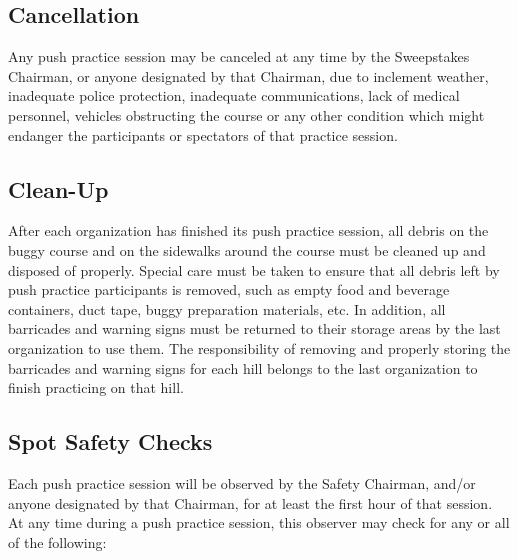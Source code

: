\subsection{Cancellation}

	Any push practice session may be canceled at any time by the Sweepstakes
	Chairman, or anyone designated by that Chairman, due to inclement weather,
	inadequate police protection, inadequate communications, lack of medical
	personnel, vehicles obstructing the course or any other condition which might
	endanger the participants or spectators of that practice session.

\subsection{Clean-Up}

	After each organization has finished its push practice session, all debris on
	the buggy course and on the sidewalks around the course must be cleaned up and
	disposed of properly. Special care must be taken to ensure that all debris left
	by push practice participants is removed, such as empty food and beverage
	containers, duct tape, buggy preparation materials, etc. In addition, all
	barricades and warning signs must be returned to their storage areas by the
	last organization to use them. The responsibility of removing and properly
	storing the barricades and warning signs for each hill belongs to the last
	organization to finish practicing on that hill.

\subsection{Spot Safety Checks}

	Each push practice session will be observed by the Safety Chairman, and/or
	anyone designated by that Chairman, for at least the first hour of that
	session. At any time during a push practice session, this observer may check
	for any or all of the following:

